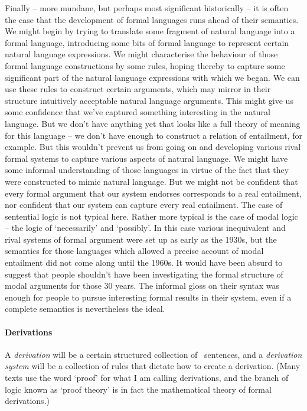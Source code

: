 Finally – more mundane, but perhaps most significant historically – it is often the case that the development of formal languages runs ahead of their semantics. We might begin by trying to translate some fragment of natural language into a formal language, introducing some bits of formal language to represent certain natural language expressions. We might characterise the behaviour of those formal language constructions by some rules, hoping thereby to capture some significant part of the natural language expressions with which we began. We can use these rules to construct certain arguments, which may mirror in their structure intuitively acceptable natural language arguments. This might give us some confidence that we've captured something interesting in the natural language. But we don't have anything yet that looks like a full theory of meaning for this language – we don't have enough to construct a relation of entailment, for example. But this wouldn't prevent us from going on and developing various rival formal systems to capture various aspects of natural language. We might have some informal understanding of those languages in virtue of the fact that they were constructed to mimic natural language. But we might not be confident that every formal argument that our system endorses corresponds to a real entailment, nor confident that our system can capture every real entailment. The case of sentential logic is not typical here. Rather more typical is the case of modal logic – the logic of `necessarily' and `possibly'. In this case various inequivalent and rival systems of formal argument were set up as early as the 1930s, but the semantics for those languages which allowed a precise account of modal entailment did not come along until the 1960s. It would have been absurd to suggest that people shouldn't have been investigating the formal structure of modal arguments for those 30 years. The informal gloss on their syntax was enough for people to pursue interesting formal results in their system, even if a complete semantics is nevertheless the ideal. 

\paragraph{Derivations}

A \emph{derivation} will be a certain structured collection of \lone\ sentences, and a \emph{derivation system} will be a collection of rules that dictate how to create a derivation.  (Many texts use the word `proof' for what I am calling derivations, and the branch of logic known as `proof theory' is in fact the mathematical theory of formal derivations.) 

